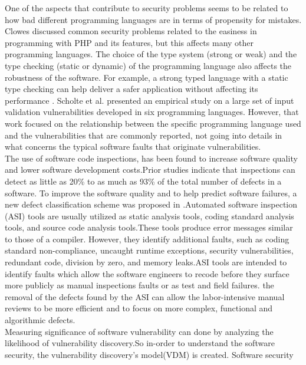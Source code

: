 \newline
One of the aspects that contribute to security problems
seems to be related to how bad different programming
languages are in terms of propensity for mistakes. Clowes  \cite{9}
discussed common security problems related to the easiness
in programming with PHP and its features, but this affects
many other programming languages. The choice of the type
system (strong or weak) and the type checking (static or
dynamic) of the programming language also affects the
robustness of the software. For example, a strong typed
language with a static type checking can help deliver a safer
application without affecting its performance  \cite{21}. Scholte et
al.  \cite{19} presented an empirical study on a large set of input
validation vulnerabilities developed in six programming
languages. However, that work focused on the relationship
between the specific programming language used and the
vulnerabilities that are commonly reported, not going into
details in what concerns the typical software faults that
originate vulnerabilities.\\
\newline
The use of software code inspections, has been found
to increase software quality and lower software
development costs.Prior studies indicate that
inspections can detect as little as 20\% to as much as
93\% of the total number of defects in a software.
 To improve the software quality  and to help predict software failures, a new
defect classification scheme was proposed in  \cite{13}.Automated software inspection
(ASI) tools are usually utilized as static analysis tools, coding standard
analysis tools, and source code analysis tools.These
tools produce error messages similar to those of a
compiler. However, they identify additional faults, such
as coding standard non-compliance, uncaught runtime
exceptions, security vulnerabilities, redundant code,
division by zero, and memory leaks.ASI tools are intended to identify faults which
allow the software engineers to recode before they
surface more publicly as manual inspections faults or as
test and field failures. the removal of the defects found by the
ASI can allow the labor-intensive manual reviews to be
more efficient and to focus on more complex, functional
and algorithmic defects.\\
\newline
Measuring significance of software vulnerability can done by analyzing the likelihood of vulnerability discovery.So in-order to understand the software security, the vulnerability discovery's model(VDM) is created. Software  security
